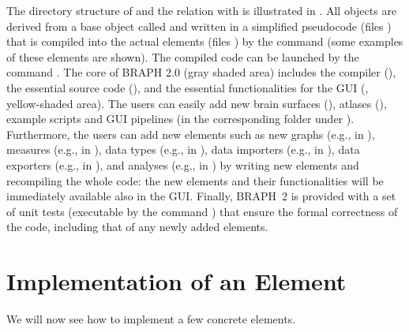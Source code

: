 \documentclass{tufte-handout}
\begin{document}
The directory structure of  and the relation with  is illustrated in .
All objects are derived from a base object called  and written in a simplified pseudocode (files ) that is compiled into the actual elements (files ) by the command  (some examples of these elements are shown).
The compiled code can be launched by the command .
The core of BRAPH 2.0 (gray shaded area) includes the compiler (), the essential source code (), and the essential functionalities for the GUI (, yellow-shaded area).
The users can easily add new brain surfaces (), atlases (), example scripts and GUI pipelines (in the corresponding folder under ).
Furthermore, the users can add new elements such as new graphs (e.g.,  in ), measures (e.g.,  in ), data types (e.g.,  in ), data importers (e.g.,  in ), data exporters (e.g.,  in ), and analyses (e.g.,  in ) by writing new elements and recompiling the whole code: the new elements and their functionalities will be immediately available also in the GUI.
Finally, BRAPH~2 is provided with a set of unit tests (executable by the command ) that ensure the formal correctness of the code, including that of any newly added elements.

\section{Implementation of an Element}

We will now see how to implement a few concrete elements.
\end{document}
